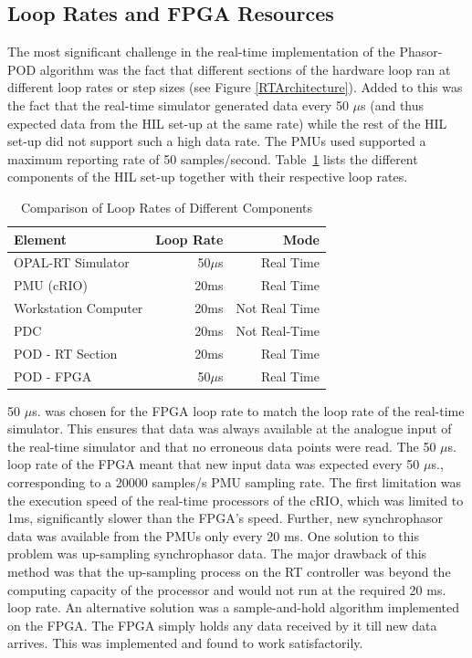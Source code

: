 \documentclass{ieeeaccess}
\begin{document}
\subsection{Loop Rates and FPGA Resources}\label{looprate}
The most significant challenge in the real-time implementation of the Phasor-POD algorithm was the fact that different sections of the hardware loop ran at different loop rates or step sizes (see Figure \ref{RTArchitecture}). Added to this was the fact that the real-time simulator generated data every 50 $\mu$s (and thus expected data from the HIL set-up at the same rate) while the rest of the HIL set-up did not support such a high data rate. The PMUs used supported a maximum reporting rate of 50 samples/second. Table~\ref{ex:LoopRates} lists the different components of the HIL set-up together with their respective loop rates.
\begin{table}[htpb]
\caption{Comparison of Loop Rates of Different Components}\label{ex:LoopRates}
\begin{center}
\begin{tabular}{|l|r|r|}
\hline \textbf{Element} & \textbf{Loop Rate} & \textbf{Mode} \\
\hline OPAL-RT Simulator & 50$\mu$s & Real Time \\ 
\hline PMU (cRIO) & 20ms & Real Time \\ 
\hline Workstation Computer& 20ms &Not Real Time\\ 
\hline PDC & 20ms &Not Real-Time\\ %
\hline POD - RT Section & 20ms & Real Time \\ 
\hline POD - FPGA & 50$\mu$s & Real Time \\ 
\hline 
\end{tabular}
\end{center}
\end{table} 

50 $\mu$s. was chosen for the FPGA loop rate to match the loop rate of the real-time simulator. This ensures that data was always available at the analogue input of the real-time simulator and that no erroneous data points were read. The 50 $\mu$s. loop rate of the FPGA meant that new input data was expected every 50 $\mu$s., corresponding to a 20000 samples/s PMU sampling rate. The first limitation was the execution speed of the real-time processors of the cRIO, which was limited to 1ms, significantly slower than the FPGA\rq{s} speed. Further, new synchrophasor data was available from the PMUs only every 20 ms. One solution to this problem was up-sampling synchrophasor data. The major drawback of this method was that the up-sampling process on the RT controller was beyond the computing capacity of the processor and would not run at the required 20 ms. loop rate. An alternative solution was a sample-and-hold algorithm implemented on the FPGA. The FPGA simply holds any data received by it till new data arrives. This was implemented and found to work satisfactorily.
\end{document}
